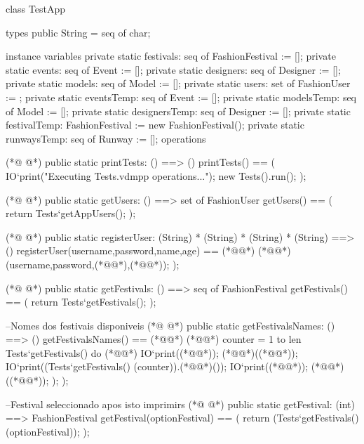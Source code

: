\begin{vdmpp}[breaklines=true]
class TestApp

types
public String = seq of char;

instance variables
private  static festivals: seq of FashionFestival := [];
private  static events: seq of Event := [];
private  static designers: seq of Designer := [];
private  static models: seq of Model := [];
private  static users: set of FashionUser := {};
private  static eventsTemp: seq of Event := [];
private  static modelsTemp: seq of Model := [];
private  static designersTemp: seq of Designer := [];
private  static festivalTemp: FashionFestival := new FashionFestival();
private  static runwaysTemp: seq of Runway := [];
operations

(*@
\label{printTests:19}
@*)
public static printTests: () ==> ()
 printTests() == 
 (
  IO`print("Executing Tests.vdmpp operations...");
    new Tests().run();   
   );
   
   
(*@
\label{getUsers:27}
@*)
 public static getUsers: () ==> set of FashionUser
 getUsers() ==
 ( 
 return Tests`getAppUsers();
 );
 
(*@
\label{registerUser:33}
@*)
  public static registerUser: (String) *  (String) * (String) * (String) ==> ()
  registerUser(username,password,name,age) == 
  (*@\vdmnotcovered{(}@*)
   (*@@*)(username,password,(*@@*),(*@@*));
  );
  
  
  
  
(*@
\label{getFestivals:42}
@*)
  public static getFestivals: () ==> seq of FashionFestival
  getFestivals() ==
  (
   return Tests`getFestivals();
  );
   
  --Nomes dos festivais disponiveis
(*@
\label{getFestivalsNames:49}
@*)
  public static getFestivalsNames: () ==> ()
 getFestivalsNames() ==
 (*@\vdmnotcovered{(}@*) 
 (*@@*) counter = 1 to len Tests`getFestivals() do (*@\vdmnotcovered{(}@*)
    IO`print((*@@*));
    (*@@*)((*@@*));
    IO`print((Tests`getFestivals() (counter)).(*@@*)());
    IO`print((*@@*));
    (*@@*)((*@@*));
   );
  );   
  
  --Festival seleccionado apos isto imprimirs
(*@
\label{getFestival:62}
@*)
  public static getFestival: (int) ==> FashionFestival
  getFestival(optionFestival) ==
  ( 
  return (Tests`getFestivals() (optionFestival));
  );
  

\end{vdmpp}
